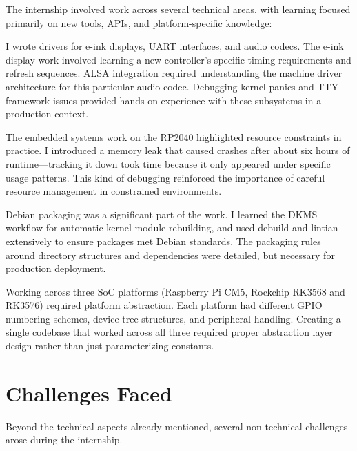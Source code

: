 \documentclass[12pt,a4paper]{report}
\begin{document}
The internship involved work across several technical areas, with learning focused primarily on new tools, APIs, and platform-specific knowledge:

\vspace{0.3cm}

I wrote drivers for e-ink displays, UART interfaces, and audio codecs. The e-ink display work involved learning a new controller's specific timing requirements and refresh sequences. ALSA integration required understanding the machine driver architecture for this particular audio codec. Debugging kernel panics and TTY framework issues provided hands-on experience with these subsystems in a production context.

\vspace{0.3cm}

The embedded systems work on the RP2040 highlighted resource constraints in practice. I introduced a memory leak that caused crashes after about six hours of runtime—tracking it down took time because it only appeared under specific usage patterns. This kind of debugging reinforced the importance of careful resource management in constrained environments.

\vspace{0.3cm}

Debian packaging was a significant part of the work. I learned the DKMS workflow for automatic kernel module rebuilding, and used debuild and lintian extensively to ensure packages met Debian standards. The packaging rules around directory structures and dependencies were detailed, but necessary for production deployment.

\vspace{0.3cm}

Working across three SoC platforms (Raspberry Pi CM5, Rockchip RK3568 and RK3576) required platform abstraction. Each platform had different GPIO numbering schemes, device tree structures, and peripheral handling. Creating a single codebase that worked across all three required proper abstraction layer design rather than just parameterizing constants.

\section{Challenges Faced}

Beyond the technical aspects already mentioned, several non-technical challenges arose during the internship.

\vspace{0.3cm}
\end{document}
